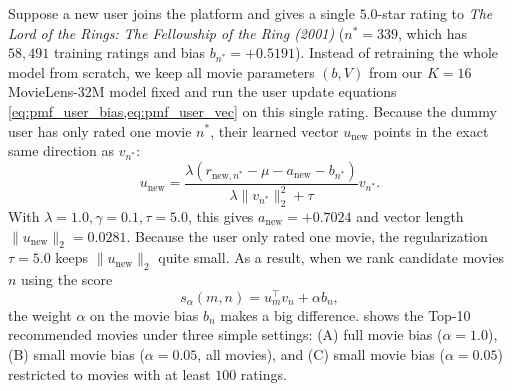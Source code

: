 \documentclass{article}
\theoremstyle{plain}
\theoremstyle{definition}
\begin{document}
Suppose a new user joins the platform and gives a single $5.0$-star rating to \emph{The Lord of the Rings: The Fellowship of the Ring (2001)} ($n^* = 339$, which has $58{,}491$ training ratings and bias $b_{n^*} = +0.5191$). Instead of retraining the whole model from scratch, we keep all movie parameters $(b, V)$ from our $K=16$ MovieLens-32M model fixed and run the user update equations \cref{eq:pmf_user_bias,eq:pmf_user_vec} on this single rating. Because the dummy user has only rated one movie $n^*$, their learned vector $u_{\text{new}}$ points in the exact same direction as $v_{n^*}$:
\begin{equation}
u_{\text{new}} = \frac{\lambda (r_{\text{new}, n^*} - \mu - a_{\text{new}} - b_{n^*})}{\lambda \|v_{n^*}\|_2^2 + \tau} v_{n^*}.
\label{eq:single_item_foldin}
\end{equation}
With $\lambda = 1.0, \gamma = 0.1, \tau = 5.0$, this gives $a_{\text{new}} = +0.7024$ and vector length $\|u_{\text{new}}\|_2 = 0.0281$. Because the user only rated one movie, the regularization $\tau = 5.0$ keeps $\|u_{\text{new}}\|_2$ quite small. As a result, when we rank candidate movies $n$ using the score
\begin{equation}
s_\alpha(m, n) = u_m^\top v_n + \alpha b_n,
\label{eq:scoring_rule}
\end{equation}
the weight $\alpha$ on the movie bias $b_n$ makes a big difference.  shows the Top-10 recommended movies under three simple settings: (A) full movie bias ($\alpha = 1.0$), (B) small movie bias ($\alpha = 0.05$, all movies), and (C) small movie bias ($\alpha = 0.05$) restricted to movies with at least $100$ ratings.
\end{document}
